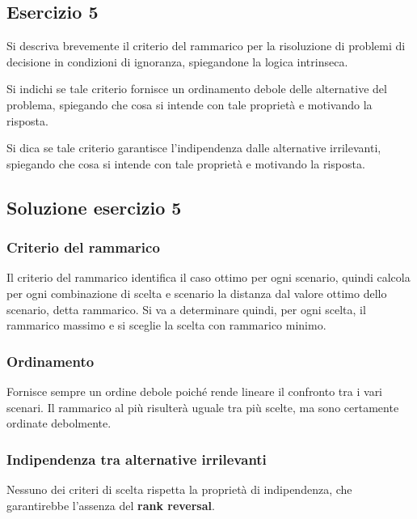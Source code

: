 \documentclass[\main/main.tex]{subfiles}
\begin{document}
\subsection{Esercizio 5}
Si descriva brevemente il criterio del rammarico per la risoluzione di problemi di decisione in condizioni di ignoranza, spiegandone la logica intrinseca.

Si indichi se tale criterio fornisce un ordinamento debole delle alternative del problema, spiegando che cosa si intende con tale proprietà e motivando la risposta.

Si dica se tale criterio garantisce l'indipendenza dalle alternative irrilevanti, spiegando che cosa si intende con tale proprietà e motivando la risposta.

\subsection{Soluzione esercizio 5}
\subsubsection*{Criterio del rammarico}
Il criterio del rammarico identifica il caso ottimo per ogni scenario, quindi calcola per ogni combinazione di scelta e scenario la distanza dal valore ottimo dello scenario, detta rammarico. Si va a determinare quindi, per ogni scelta, il rammarico massimo e si sceglie la scelta con rammarico minimo.

\subsubsection*{Ordinamento}
Fornisce sempre un ordine debole poiché rende lineare il confronto tra i vari scenari. Il rammarico al più risulterà uguale tra più scelte, ma sono certamente ordinate debolmente.

\subsubsection*{Indipendenza tra alternative irrilevanti}
Nessuno dei criteri di scelta rispetta la proprietà di indipendenza, che garantirebbe l'assenza del \textbf{rank reversal}.
\end{document}
